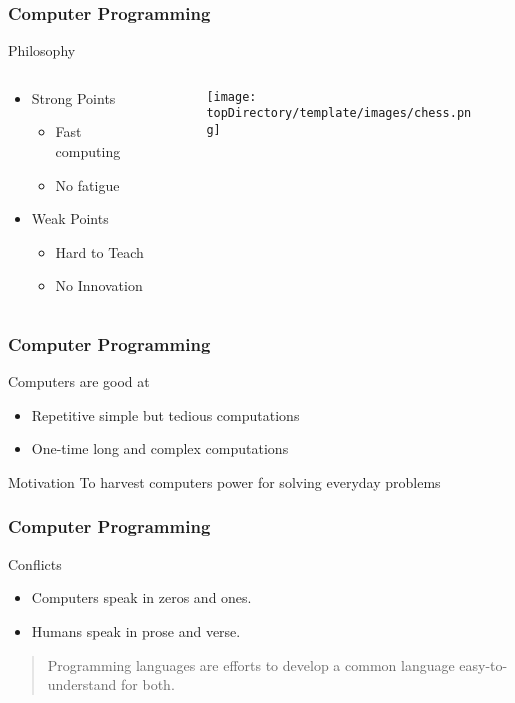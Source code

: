 \documentclass[10pt, compress]{beamer}
\begin{document}
\begin{frame}[fragile]
	\frametitle{Computer Programming}
	\begin{block}{Philosophy}
		\begin{columns}
			\begin{column}{0.4\textwidth}
			\begin{itemize}
				\item[] Strong Points
				\begin{itemize}
					\item[] Fast computing
					\item[] No fatigue
				\end{itemize}
				\item[] Weak Points
				\begin{itemize}
					\item[] Hard to Teach
					\item[] No Innovation
				\end{itemize}
			\end{itemize}
			\end{column}
			\begin{column}{0.6\textwidth}
			\begin{figure}[H]\centering
				\texttt{[image: \\topDirectory/template/images/chess.png]}
			\end{figure}
			\end{column}
		\end{columns}
	\end{block}
\end{frame}

\begin{frame}[fragile]
	\frametitle{Computer Programming}
	\begin{block}{Computers are good at}
		\begin{itemize}
			\item[] Repetitive simple but tedious computations
			\item[] One-time long and complex computations
		\end{itemize}
	\end{block}
	\begin{block}{Motivation}
		To harvest computers power for solving everyday problems
	\end{block}
\end{frame}

\begin{frame}[fragile]
	\frametitle{Computer Programming}
	\begin{block}{Conflicts}
		\begin{itemize}
			\item[] Computers speak in zeros and ones.
			\item[] Humans speak in prose and verse.
		\end{itemize}
	\end{block}
	\begin{quote}
		Programming languages are efforts to develop a common language easy-to-understand for both.
	\end{quote}
\end{frame}
\end{document}
